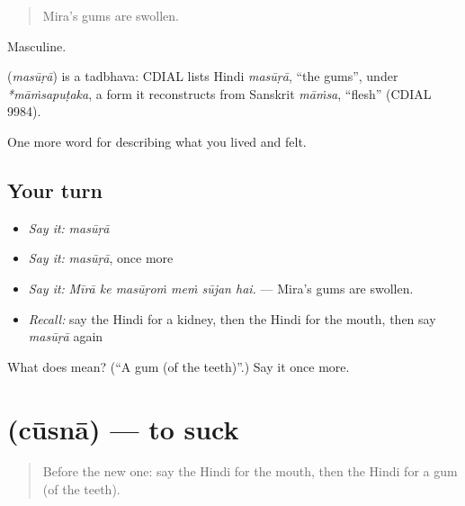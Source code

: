 \begin{quote}
Mira's gums are swollen.
\end{quote}

Masculine.

\begin{cousinweb}
\textbf{} (\emph{masūṛā}) is a tadbhava: CDIAL lists Hindi \emph{masūṛā}, \textquotedblleft{}the gums\textquotedblright{}, under \emph{*māṁsapuṭaka}, a form it reconstructs from Sanskrit \emph{māṁsa}, \textquotedblleft{}flesh\textquotedblright{} (CDIAL 9984).
\end{cousinweb}

\begin{grammarlens}[title={What you've built}]
One more word for describing what you lived and felt.
\end{grammarlens}

\subsection*{Your turn}
\begin{itemize}
\raggedright
  \item \emph{Say it:} \emph{masūṛā}
  \item \emph{Say it:} \emph{masūṛā}, once more
  \item \emph{Say it:} \emph{Mīrā ke masūṛoṁ meṁ sūjan hai.} — Mira's gums are swollen.
  \item \emph{Recall:} say the Hindi for a kidney, then the Hindi for the mouth, then say \emph{masūṛā} again
\end{itemize}

\begin{tcolorbox}[breakable,colback=teal!4,colframe=teal!35!black,title={Before you move on}]
What does  mean? (\textquotedblleft{}A gum (of the teeth)\textquotedblright{}.) Say it once more.
\end{tcolorbox}
\section[\texorpdfstring{\hi{चूसना} (cūsnā)}{चूसना (cūsnā)}]{ (cūsnā) — to suck}

\label{lesson:HI-C479-cusna}



\begin{quote}
Before the new one: say the Hindi for the mouth, then the Hindi for a gum (of the teeth).
\end{quote}

